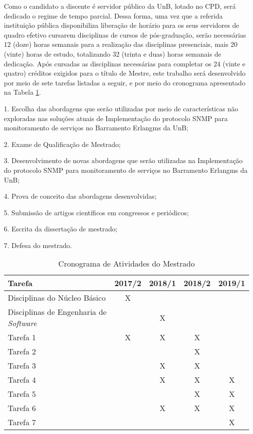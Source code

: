 \documentclass[qualidr]{eesc}
\begin{document}
Como o candidato a discente é servidor público da UnB, lotado no CPD, será dedicado o regime de tempo parcial. Dessa forma, uma vez que a referida instituição pública disponibiliza liberação de horário para os seus servidores de quadro efetivo cursarem disciplinas de cursos de pós-graduação, serão necessárias 12 (doze) horas semanais para a realização das disciplinas presenciais, mais 20 (vinte) horas de estudo, totalizando 32 (trinta e duas) horas semanais de dedicação. Após cursadas as disciplinas necessárias para completar os 24 (vinte e quatro) créditos exigidos para o título de Mestre, este trabalho será desenvolvido por meio de sete tarefas listadas a seguir, e por meio do cronograma apresentado na Tabela \ref{tab:cronograma2}.

1. Escolha das abordagens que serão utilizadas por meio de características não exploradas nas soluções atuais de Implementação do protocolo SNMP para monitoramento de serviços no Barramento Erlangms da UnB;

2. Exame de Qualificação de Mestrado;

3. Desenvolvimento de novas abordagens que serão utilizadas na Implementação do protocolo SNMP para monitoramento de serviços no Barramento Erlangms da UnB;

4. Prova de conceito das abordagens desenvolvidas;

5. Submissão de artigos científicos em congressos e periódicos;

6. Escrita da dissertação de mestrado;

7. Defesa do mestrado.

\begin{table}[!htpb]
	\centering
	\caption{Cronograma de Atividades do Mestrado}
	\begin{center}
		\begin{tabular}{|l|c|c|c|c|}
			\hline
			Tarefa  &2017/2   &2018/1 &2018/2 &2019/1   \\
			\hline\hline
			Disciplinas do Núcleo Básico &X & & & \\
			\hline
			Disciplinas de Engenharia de \textit{Software} & &X & &  \\
			\hline
			Tarefa 1 &X &X &X &  \\
			\hline
			Tarefa 2 & & &X &  \\
			\hline
			Tarefa 3 & &X&X &  \\
			\hline
			Tarefa 4 & &X &X &X  \\
			\hline
			Tarefa 5 & & &X &X  \\
			\hline
			Tarefa 6 & &X&X&X  \\
			\hline
			Tarefa 7 & & & &X  \\
			\hline
		\end{tabular}
		\label{tab:cronograma2}
	\end{center}
\end{table} 
\end{document}
